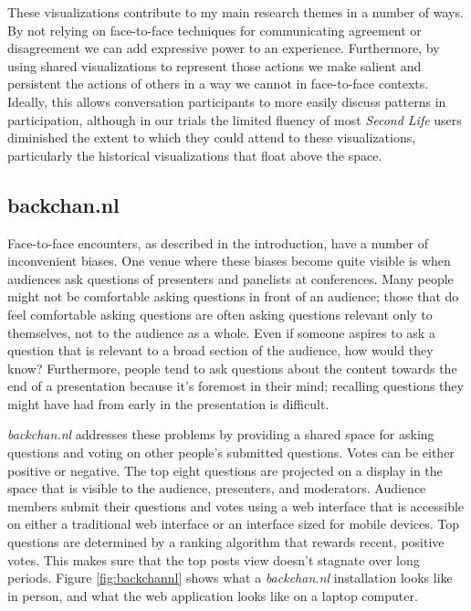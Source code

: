 \documentclass{tufte-handout}
\begin{document}
These visualizations contribute to my main research themes in a number of ways. By not relying on face-to-face techniques for communicating agreement or disagreement  we can add expressive power to an experience. Furthermore, by using shared visualizations to represent those actions we make salient and persistent the actions of others in a way we cannot in face-to-face contexts. Ideally, this allows conversation participants to more easily discuss patterns in participation, although in our trials the limited fluency of most \emph{Second Life} users diminished the extent to which they could attend to these visualizations, particularly the historical visualizations that float above the space.



\subsection{backchan.nl}

Face-to-face encounters, as described in the introduction, have a number of inconvenient biases. One venue where these biases become quite visible is when audiences ask questions of presenters and panelists at conferences. Many people might not be comfortable asking questions in front of an audience; those that do feel comfortable asking questions are often asking questions relevant only to themselves, not to the audience as a whole. Even if someone aspires to ask a question that is relevant to a broad section of the audience, how would they know? Furthermore, people tend to ask questions about the content towards the end of a presentation because it's foremost in their mind; recalling questions they might have had from early in the presentation is difficult.

\emph{backchan.nl} addresses these problems by providing a shared space for asking questions and voting on other people's submitted questions. Votes can be either positive or negative. The top eight questions are projected on a display in the space that is visible to the audience, presenters, and moderators. Audience members submit their questions and votes using a web interface that is accessible on either a traditional web interface or an interface sized for mobile devices. Top questions are determined by a ranking algorithm that rewards recent, positive votes. This makes sure that the top posts view doesn't stagnate over long periods. Figure \ref{fig:backchannl} shows what a \emph{backchan.nl} installation looks like in person, and what the web application looks like on a laptop computer. 
\end{document}
